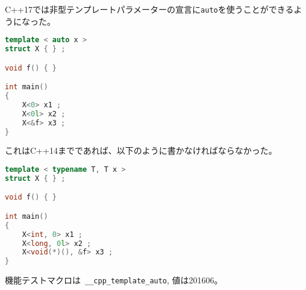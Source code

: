 %

C++17では非型テンプレートパラメーターの宣言に\lstinline!auto!を使うことができるようになった。

\begin{lstlisting}[language=C++]
template < auto x >
struct X { } ;

void f() { }

int main()
{
    X<0> x1 ;
    X<0l> x2 ;
    X<&f> x3 ;
}
\end{lstlisting}

これはC++14までであれば、以下のように書かなければならなかった。

\begin{lstlisting}[language=C++]
template < typename T, T x >
struct X { } ;

void f() { }

int main()
{
    X<int, 0> x1 ;
    X<long, 0l> x2 ;
    X<void(*)(), &f> x3 ;
}
\end{lstlisting}

機能テストマクロは~\lstinline!__cpp_template_auto!, 値は201606。
